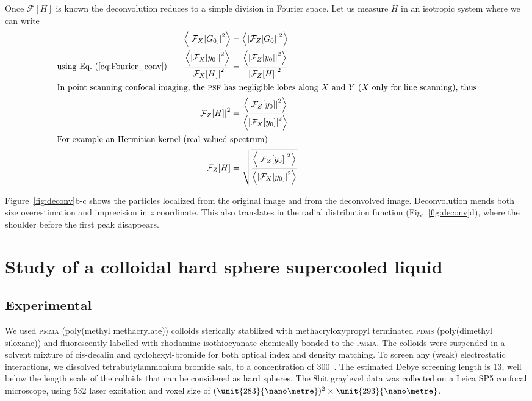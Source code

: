 \documentclass[8.5pt,twoside,twocolumn]{article}
\begin{document}
Once $\mathcal{F}[H]$ is known the deconvolution reduces to a simple division in Fourier space. Let us measure $H$ in an isotropic system where we can write
\begin{align}
\left\langle \left|\mathcal{F}_X[G_0]\right|^2 \right\rangle  &= \left\langle \left|\mathcal{F}_Z[G_0]\right|^2 \right\rangle \\
\text{using Eq.~(\ref{eq:Fourier_conv})}\qquad 
\frac{\left\langle\left|\mathcal{F}_X[y_0]\right|^2 \right\rangle}{\left|\mathcal{F}_X[H]\right|^2}  &= \frac{\left\langle \left|\mathcal{F}_Z[y_0]\right|^2\right\rangle}{\left|\mathcal{F}_Z[H]\right|^2} \\
\intertext{In point scanning confocal imaging, the \textsc{psf} has negligible lobes along $X$ and $Y$ ($X$ only for line scanning), thus}
\left|\mathcal{F}_Z[H]\right|^2 &= \frac{\left\langle \left|\mathcal{F}_Z[y_0]\right|^2\right\rangle}{\left\langle\left|\mathcal{F}_X[y_0]\right|^2 \right\rangle}\\
\intertext{For example an Hermitian kernel (real valued spectrum)}
\mathcal{F}_Z[H] &= \sqrt{\frac{\left\langle \left|\mathcal{F}_Z[y_0]\right|^2\right\rangle}{\left\langle\left|\mathcal{F}_X[y_0]\right|^2 \right\rangle}}
\end{align}

Figure~\ref{fig:deconv}b-c shows the particles localized from the original image and from the deconvolved image. Deconvolution mends both size overestimation and imprecision in $z$ coordinate. This also translates in the radial distribution function (Fig.~\ref{fig:deconv}d), where the shoulder before the first peak disappears.



\section*{Study of a colloidal hard sphere supercooled liquid}

\subsection*{Experimental}
We used \textsc{pmma} (poly(methyl methacrylate)) colloids sterically stabilized with methacryloxypropyl terminated \textsc{pdms} (poly(dimethyl siloxane)) and fluorescently labelled with rhodamine isothiocyanate chemically bonded to the \textsc{pmma}. The colloids were suspended in a solvent mixture of cis-decalin and cyclohexyl-bromide for both optical index and density matching. To screen any (weak) electrostatic interactions, we dissolved tetrabutylammonium bromide salt, to a concentration of \unit{300}{\nano\mole\per\liter}~\citep{royall2005}. The estimated Debye screening length is \unit{13}{\nano\metre}, well below the length scale of the colloids that can be considered as hard spheres. The \unit{8}{bit} graylevel data was collected on a Leica SP5 confocal microscope, using \unit{532}{\nano\meter} laser excitation and voxel size of $(\unit{283}{\nano\metre})^2\times\unit{293}{\nano\metre}$.
\end{document}

